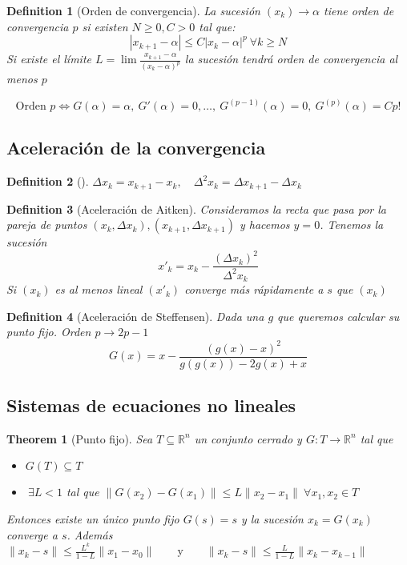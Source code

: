 \documentclass[leqno]{article}
\newtheorem*{definition}{Definition}
\newtheorem*{theorem}{Theorem}
\begin{document}
\begin{definition}[Orden de convergencia] La sucesión $(x_k) \to \alpha $ tiene orden de convergencia  $p$ si existen $N\ge 0, C>0$ tal que:
  \[
  |x_{k+1}-\alpha |\le C|x_k-\alpha |^p \ \forall k\ge N
  \] 
  Si existe el límite $\displaystyle L = \lim \frac{x_{k+1}-\alpha }{(x_k-\alpha )^p}$ la sucesión tendrá orden de convergencia al menos $p$
\end{definition}
\[
  \text{Orden } p \iff G(\alpha )=\alpha , \ G'(\alpha )=0, \ldots ,\ G^{(p-1)}(\alpha )=0,\ G^{(p)}(\alpha )=Cp!
\] 

\subsection{Aceleración de la convergencia}
\begin{definition}[] $\Delta x_k = x_{k+1}-x_k, \quad \Delta^2 x_{k} = \Delta x_{k+1}-\Delta x_k$
\end{definition}
\begin{definition}[Aceleración de Aitken]
Consideramos la recta que pasa por la pareja de puntos $(x_k, \Delta x_k), (x_{k+1}, \Delta x_{k+1})$ y hacemos $y=0$. Tenemos la sucesión
 \[
x'_k = x_k -\frac{(\Delta x_k)^2}{\Delta^2 x_k}
\]
Si $(x_k)$ es al menos lineal  $(x'_{k})$ converge más rápidamente a $s$ que  $(x_k)$
\end{definition}

\begin{definition}[Aceleración de Steffensen] Dada una $g$ que queremos calcular su punto fijo. Orden $p\to 2p-1$
  \[
  G(x) = x - \frac{(g(x)-x)^2}{g(g(x)) - 2g(x) + x}
  \] 
\end{definition}

\subsection{Sistemas de ecuaciones no lineales}
\begin{theorem}[Punto fijo]
Sea $T\subseteq \mathbb{R}^n$ un conjunto cerrado y $G: T\to \mathbb{R}^n$ tal que
\begin{itemize}[topsep=-6pt, itemsep=0pt]
  \item $G(T)\subseteq T$
  \item $\ \exists L<1$ tal que $\|G(x_2)-G(x_1)\|\le L\|x_2-x_1\| \ \forall x_1, x_2\in T$
\end{itemize}
Entonces existe un único punto fijo $G(s)=s$ y la sucesión $x_k = G(x_k)$ converge a $s$. Además
$\|x_k - s\|\le \frac{L^k}{1-L}\|x_1-x_0\| \qquad \text{y} \qquad \|x_k-s\|\le \frac{L}{1-L}\|x_k-x_{k-1}\|$
\end{theorem}
\end{document}
